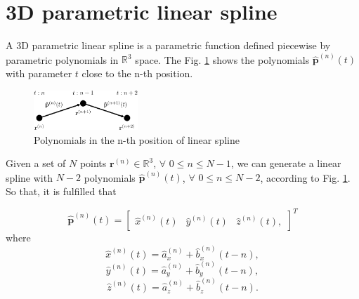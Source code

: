 

\section{3D parametric linear spline }
A 3D parametric linear spline is a parametric function defined piecewise by parametric polynomials in $\mathbb{R}^{3}$ space.
The Fig. \ref{fig:3DLinearSplinePoly} shows the polynomials $\mathbf{\hat{p}}^{(n)}(t)$ with parameter $t$ 
close to the n-th position.
\begin{figure}[H]
    \centering
    \includegraphics[width=0.35\textwidth]{boveda/Diagrama0.eps}
    \caption{Polynomials in the n-th position of linear spline}
    \label{fig:3DLinearSplinePoly}
\end{figure}

Given a set of $N$ points $\mathbf{r}^{(n)}\in\mathbb{R}^{3}$, $\forall$ $0\leq n \leq N-1$, 
we can generate a linear spline with $N-2$ polynomials $\mathbf{\hat{p}}^{(n)}(t)$, $\forall$ $0\leq n \leq N-2$, 
according to Fig. \ref{fig:3DLinearSplinePoly}.
So that, it is fulfilled that 

\begin{equation}
\mathbf{\hat{p}}^{(n)}(t)=
\begin{bmatrix}
\hat{x}^{(n)}(t) & \hat{y}^{(n)}(t) & \hat{z}^{(n)}(t),
\end{bmatrix}^{T}
\end{equation}
where
\begin{equation}
\hat{x}^{(n)}(t)=\hat{a}_{x}^{(n)}+\hat{b}_{x}^{(n)}(t-n),
\end{equation}
\begin{equation}
\hat{y}^{(n)}(t)=\hat{a}_{y}^{(n)}+\hat{b}_{y}^{(n)}(t-n),
\end{equation}
\begin{equation}
\hat{z}^{(n)}(t)=\hat{a}_{z}^{(n)}+\hat{b}_{z}^{(n)}(t-n).
\end{equation}



